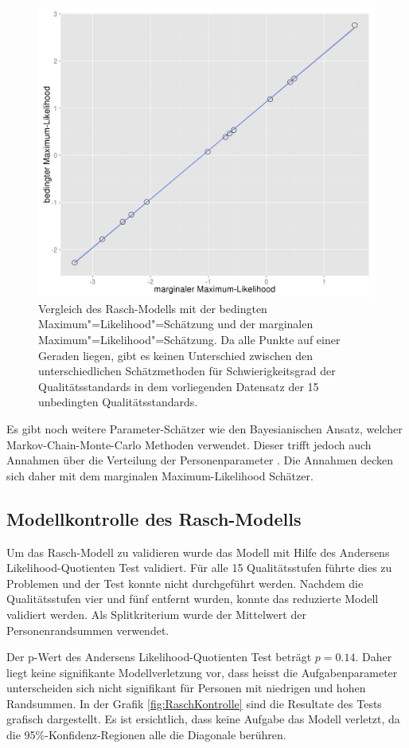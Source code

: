 \begin{figure}[htbp]

\centering
\includegraphics[width=0.6\linewidth]{graphics/RaschVergleich.png}
\caption{Vergleich des Rasch-Modells mit der bedingten Maximum"=Likelihood"=Schätzung und der marginalen Maximum"=Likelihood"=Schätzung. Da alle Punkte auf einer Geraden liegen, gibt es keinen Unterschied zwischen den unterschiedlichen Schätzmethoden für Schwierigkeitsgrad der Qualitätsstandards in dem vorliegenden Datensatz der 15 unbedingten Qualitätsstandards.  }
\label{fig:RaschVergleich}
\end{figure}


Es gibt noch weitere Parameter-Schätzer wie den Bayesianischen Ansatz, welcher Markov-Chain-Monte-Carlo Methoden verwendet. Dieser trifft jedoch auch Annahmen über die Verteilung der Personenparameter \citep[siehe Kapitel 3]{Fischer1995}. Die Annahmen decken sich daher mit dem marginalen Maximum-Likelihood Schätzer. 




\subsection{Modellkontrolle des Rasch-Modells}

Um das Rasch-Modell zu validieren wurde das Modell mit Hilfe des Andersens Likelihood-Quotienten Test validiert. Für alle 15 Qualitätsstufen führte dies zu Problemen und der Test konnte nicht durchgeführt werden. Nachdem die Qualitätsstufen vier und fünf entfernt wurden, konnte das reduzierte Modell validiert werden. Als Splitkriterium wurde der Mittelwert der Personenrandsummen verwendet. 

Der p-Wert des Andersens Likelihood-Quotienten Test beträgt $p=0.14$. Daher liegt keine signifikante Modellverletzung vor, dass heisst die Aufgabenparameter unterscheiden sich nicht signifikant für Personen mit niedrigen und hohen Randsummen. In der Grafik \ref{fig:RaschKontrolle} sind die Resultate des Tests grafisch dargestellt. Es ist ersichtlich, dass keine Aufgabe das Modell verletzt, da die 95\%-Konfidenz-Regionen alle die Diagonale berühren.


